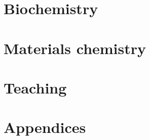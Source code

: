 \part{Biochemistry}





\part{Materials chemistry}










\part{Teaching}


\appendix
\part{Appendices}




